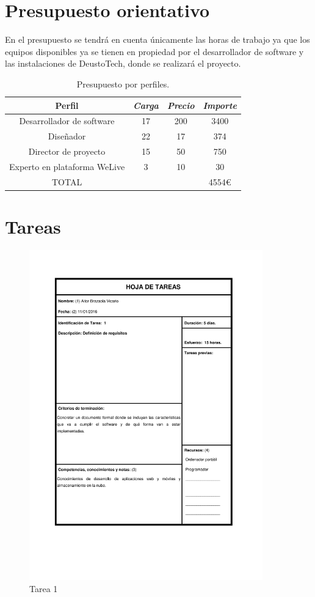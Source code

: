 \documentclass{DeustoFDP}
\begin{document}
\section{Presupuesto orientativo}
En el presupuesto se tendrá en cuenta únicamente las horas de trabajo ya que los equipos disponibles ya se tienen en propiedad por el desarrollador de software y las instalaciones de DeustoTech, donde se realizará el proyecto.
\begin{table}[H]
    \centering
    \caption{Presupuesto por perfiles.}\label{tab:presupuestoperfiles}
    \begin{tabular}{cccc}
        \toprule
        \textbf{Perfil} & \emph{Carga} & \emph{Precio} & \emph{Importe}\\
        \midrule
        Desarrollador de software  & 17     & 200 & 3400 \\
        Diseñador   & 22     & 17 & 374 \\
        Director de proyecto & 15     & 50  & 750 \\
        Experto en plataforma WeLive & 3     & 10 & 30 \\
        TOTAL & & & 4554€\\
        \bottomrule
    \end{tabular}
\end{table}
\newpage
\section{Tareas}
\begin{figure}[H]
    \centering
    \includegraphics[width=0.9\textwidth]{fig/Tareas/1}
    \caption{Tarea 1}
    \label{fig:t1}
\end{figure}
\end{document}
